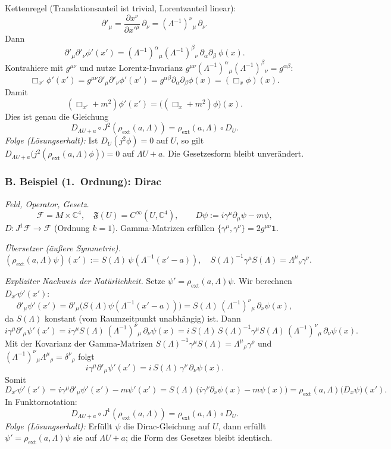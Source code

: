 \documentclass[10pt, letterpaper]{article}
\newcommand{\C}{\mathbb{C}}
\begin{document}
Kettenregel (Translationsanteil ist trivial, Lorentzanteil linear):
\[
\partial'_\mu = \frac{\partial x^\nu}{\partial x'^\mu}\, \partial_\nu
= (\Lambda^{-1})^\nu{}_\mu\,\partial_\nu.
\]
Dann
\[
\partial'_\mu\partial'_\nu \phi'(x')
= (\Lambda^{-1})^\alpha{}_\mu(\Lambda^{-1})^\beta{}_\nu
\,\partial_\alpha\partial_\beta\ \phi(x).
\]
Kontrahiere mit $g^{\mu\nu}$ und nutze Lorentz-Invarianz $g^{\mu\nu}(\Lambda^{-1})^\alpha{}_\mu(\Lambda^{-1})^\beta{}_\nu
= g^{\alpha\beta}$:
\[
\Box_{x'}\phi'(x')
= g^{\mu\nu}\partial'_\mu\partial'_\nu \phi'(x')
= g^{\alpha\beta}\partial_\alpha\partial_\beta \phi(x)
= (\Box_x\phi)(x).
\]
Damit
\[
(\Box_{x'}+m^2)\phi'(x') = \big((\Box_x+m^2)\phi\big)(x).
\]
Dies ist genau die Gleichung
\[
D_{\Lambda U+a}\circ J^2(\rho_{\mathrm{ext}}(a,\Lambda))
=\rho_{\mathrm{ext}}(a,\Lambda)\circ D_U.
\]
\emph{Folge (Lösungserhalt):}
Ist $D_U(j^2\phi)=0$ auf $U$, so gilt
$D_{\Lambda U+a}\big(j^2(\rho_{\mathrm{ext}}(a,\Lambda)\phi)\big)=0$ auf $\Lambda U+a$.
Die Gesetzesform bleibt unverändert.

\bigskip
\subsubsection*{B. Beispiel (1.\ Ordnung): Dirac}

\emph{Feld, Operator, Gesetz.}
\[
\mathcal F=M\times\C^4,\quad \mathfrak F(U)=C^\infty(U,\C^4),
\qquad
D\psi := i\gamma^\mu\partial_\mu\psi - m\psi,
\]
$D:J^1\mathcal F\to \mathcal F$ (Ordnung $k=1$).
Gamma-Matrizen erfüllen $\{\gamma^\mu,\gamma^\nu\}=2g^{\mu\nu}\mathbf 1$.

\emph{Übersetzer (äußere Symmetrie).}
\[
(\rho_{\mathrm{ext}}(a,\Lambda)\psi)(x')
:= S(\Lambda)\,\psi(\Lambda^{-1}(x'-a)),
\quad
S(\Lambda)^{-1}\gamma^\mu S(\Lambda)=\Lambda^\mu{}_\nu\gamma^\nu.
\]

\emph{Expliziter Nachweis der Natürlichkeit.}
Setze $\psi'=\rho_{\mathrm{ext}}(a,\Lambda)\psi$.
Wir berechnen $D_{x'}\psi'(x')$:
\[
\partial'_\mu \psi'(x')
= \partial'_\mu\big(S(\Lambda)\psi(\Lambda^{-1}(x'-a))\big)
= S(\Lambda)\,(\Lambda^{-1})^\nu{}_\mu\,\partial_\nu\psi(x),
\]
da $S(\Lambda)$ konstant (vom Raumzeitpunkt unabhängig) ist.
Dann
\[
i\gamma^\mu\partial'_\mu\psi'(x')
= i\gamma^\mu S(\Lambda)\,(\Lambda^{-1})^\nu{}_\mu\,\partial_\nu\psi(x)
= i\,S(\Lambda)\, S(\Lambda)^{-1}\gamma^\mu S(\Lambda)\,(\Lambda^{-1})^\nu{}_\mu\,\partial_\nu\psi(x).
\]
Mit der Kovarianz der Gamma-Matrizen
$S(\Lambda)^{-1}\gamma^\mu S(\Lambda)=\Lambda^\mu{}_\rho\gamma^\rho$
und $(\Lambda^{-1})^\nu{}_\mu \Lambda^\mu{}_\rho=\delta^\nu{}_\rho$ folgt
\[
i\gamma^\mu\partial'_\mu\psi'(x')
= i\,S(\Lambda)\,\gamma^\nu\,\partial_\nu\psi(x).
\]
Somit
\[
D_{x'}\psi'(x')
= i\gamma^\mu\partial'_\mu\psi'(x')-m\psi'(x')
= S(\Lambda)\,\big(i\gamma^\nu\partial_\nu\psi(x)-m\psi(x)\big)
= \rho_{\mathrm{ext}}(a,\Lambda)\big(D_x\psi\big)(x').
\]
In Funktornotation:
\[
D_{\Lambda U+a}\circ J^1(\rho_{\mathrm{ext}}(a,\Lambda))
= \rho_{\mathrm{ext}}(a,\Lambda)\circ D_U.
\]
\emph{Folge (Lösungserhalt):}
Erfüllt $\psi$ die Dirac-Gleichung auf $U$, dann erfüllt
$\psi'=\rho_{\mathrm{ext}}(a,\Lambda)\psi$ sie auf $\Lambda U + a$;
die Form des Gesetzes bleibt identisch.
\end{document}
